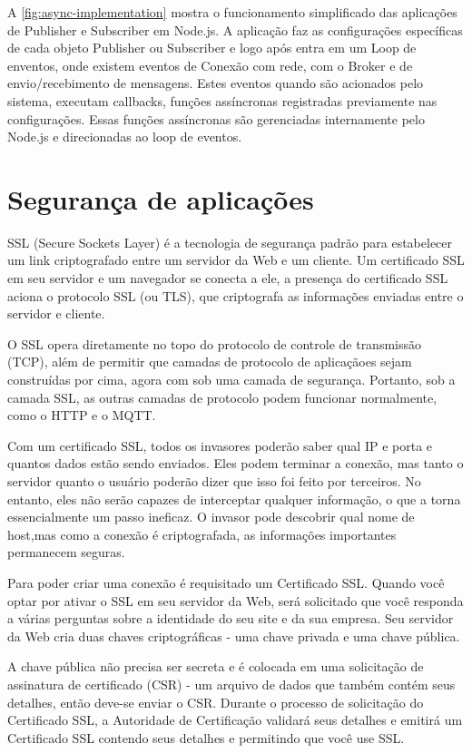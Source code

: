 A \ref{fig:async-implementation} mostra o funcionamento simplificado das aplicações de Publisher e Subscriber em Node.js. A aplicação faz as configurações específicas de cada objeto Publisher ou Subscriber e logo após entra em um Loop de enventos, onde existem eventos de Conexão com rede, com o Broker e de envio/recebimento de mensagens. Estes eventos quando são acionados pelo sistema, executam callbacks, funções assíncronas registradas previamente nas configurações. Essas funções assíncronas são gerenciadas internamente pelo Node.js e direcionadas ao loop de eventos.

\section{Segurança de aplicações}
\label{section:seguranca}

SSL \cite{ssl} (Secure Sockets Layer) é a tecnologia de segurança padrão para estabelecer um link criptografado entre um servidor da Web e um cliente. Um certificado SSL em seu servidor e um navegador se conecta a ele, a presença do certificado SSL aciona o protocolo SSL (ou TLS), que criptografa as informações enviadas entre o servidor e cliente.

O SSL opera diretamente no topo do protocolo de controle de transmissão (TCP), além de permitir que camadas de protocolo de aplicaçãoes sejam construídas por cima, agora com sob uma camada de segurança. Portanto, sob a camada SSL, as outras camadas de protocolo podem funcionar normalmente, como o HTTP e o MQTT.

Com um certificado SSL, todos os invasores poderão saber qual IP e porta e quantos dados estão sendo enviados. Eles podem terminar a conexão, mas tanto o servidor quanto o usuário poderão dizer que isso foi feito por terceiros. No entanto, eles não serão capazes de interceptar qualquer informação, o que a torna essencialmente um passo ineficaz. O invasor pode descobrir qual nome de host,mas como a conexão é criptografada, as informações importantes permanecem seguras.

Para poder criar uma conexão é requisitado um Certificado SSL. Quando você optar por ativar o SSL em seu servidor da Web, será solicitado que você responda a várias perguntas sobre a identidade do seu site e da sua empresa. Seu servidor da Web cria duas chaves criptográficas - uma chave privada e uma chave pública.

A chave pública não precisa ser secreta e é colocada em uma solicitação de assinatura de certificado (CSR) - um arquivo de dados que também contém seus detalhes, então deve-se enviar o CSR. Durante o processo de solicitação do Certificado SSL, a Autoridade de Certificação validará seus detalhes e emitirá um Certificado SSL contendo seus detalhes e permitindo que você use SSL.

